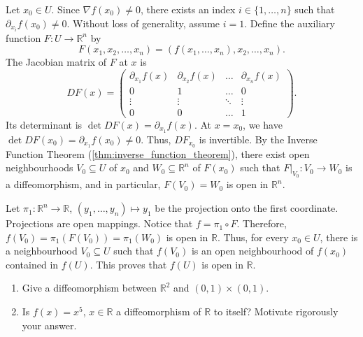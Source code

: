 \begin{exercisesolution}
Let $x_0 \in U$. Since $\nabla f(x_0) \neq 0$, there exists an index $i \in \{1,\dots,n\}$ such that $\partial_{x_i} f(x_0) \neq 0$. Without loss of generality, assume $i=1$.
Define the auxiliary function $F : U \to \mathbb{R}^n$ by
\[ F(x_1, x_2, \dots, x_n) = (f(x_1, \dots, x_n), x_2, \dots, x_n). \]
The Jacobian matrix of $F$ at $x$ is
\[ DF(x) = \begin{pmatrix} \partial_{x_1} f(x) & \partial_{x_2} f(x) & \dots & \partial_{x_n} f(x) \\ 0 & 1 & \dots & 0 \\ \vdots & \vdots & \ddots & \vdots \\ 0 & 0 & \dots & 1 \end{pmatrix}. \]
Its determinant is $\det DF(x) = \partial_{x_1} f(x)$.
At $x = x_0$, we have $\det DF(x_0) = \partial_{x_1} f(x_0) \neq 0$. Thus, $DF_{x_0}$ is invertible.
By the Inverse Function Theorem (\cref{thm:inverse_function_theorem}), there exist open neighbourhoods $V_0 \subseteq U$ of $x_0$ and $W_0 \subseteq \mathbb{R}^n$ of $F(x_0)$ such that $F|_{V_0} : V_0 \to W_0$ is a diffeomorphism, and in particular, $F(V_0) = W_0$ is open in $\mathbb{R}^n$.

Let $\pi_1 : \mathbb{R}^n \to \mathbb{R}$, $(y_1, \dots, y_n) \mapsto y_1$ be the projection onto the first coordinate. Projections are open mappings.
Notice that $f = \pi_1 \circ F$. Therefore, $f(V_0) = \pi_1(F(V_0)) = \pi_1(W_0)$ is open in $\mathbb{R}$.
Thus, for every $x_0 \in U$, there is a neighbourhood $V_0 \subseteq U$ such that $f(V_0)$ is an open neighbourhood of $f(x_0)$ contained in $f(U)$. This proves that $f(U)$ is open in $\mathbb{R}$.
\end{exercisesolution}


\begin{exercise}
\label{ex:diffeomorphism_properties}
\begin{enumerate}[label=\textbf{(\alph*)}]
  \item Give a diffeomorphism between $\mathbb{R}^2$ and $(0,1)\times(0,1)$.
  \item Is $f(x) = x^5$, $x \in \mathbb{R}$ a diffeomorphism of $\mathbb{R}$ to itself? Motivate
    rigorously your answer.
\end{enumerate}
\end{exercise}

